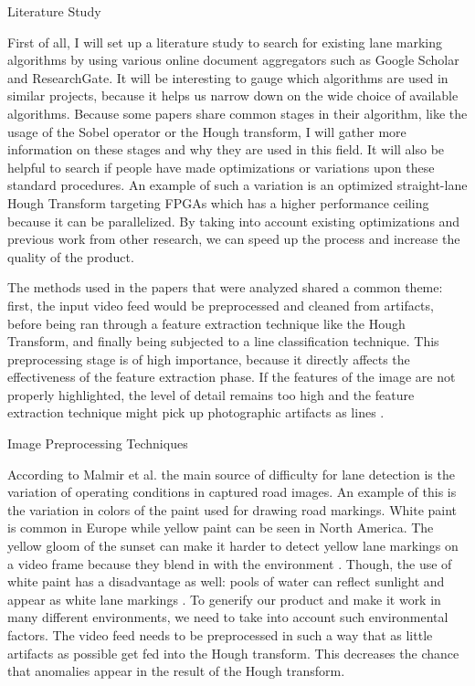\documentclass{matthijs}
\begin{document}
	\begin{hoofdstuk}{Literature Study}

		First of all, I will set up a literature study to search for existing lane marking algorithms by using various online document aggregators such as Google Scholar and ResearchGate.
		It will be interesting to gauge which algorithms are used in similar projects, because it helps us narrow down on the wide choice of available algorithms.
		Because some papers share common stages in their algorithm, like the usage of the Sobel operator or the Hough transform, I will gather more information on these stages and why they are used in this field.
		It will also be helpful to search if people have made optimizations or variations upon these standard procedures.
		An example of such a variation is an optimized straight-lane Hough Transform targeting FPGAs \cite{el2020novel} which has a higher performance ceiling because it can be parallelized.
		By taking into account existing optimizations and previous work from other research, we can speed up the process and increase the quality of the product.
	
		The methods used in the papers that were analyzed shared a common theme: first, the input video feed would be preprocessed and cleaned from artifacts, before being ran through a feature extraction technique like the Hough Transform, and finally being subjected to a line classification technique.
		This preprocessing stage is of high importance, because it directly affects the effectiveness of the feature extraction phase.
		If the features of the image are not properly highlighted, the level of detail remains too high and the feature extraction technique might pick up photographic artifacts as lines \cite{felix2003low}.

		\begin{paragraaf}{Image Preprocessing Techniques}

			According to Malmir et al. \cite{malmir2019design} the main source of difficulty for lane detection is the variation of operating conditions in captured road images.
			An example of this is the variation in colors of the paint used for drawing road markings.
			White paint is common in Europe while yellow paint can be seen in North America.
			The yellow gloom of the sunset can make it harder to detect yellow lane markings on a video frame because they blend in with the environment \cite{tumasov2021research}.
			Though, the use of white paint has a disadvantage as well: pools of water can reflect sunlight and appear as white lane markings \cite{krine2021road}.
			To generify our product and make it work in many different environments, we need to take into account such environmental factors.
			The video feed needs to be preprocessed in such a way that as little artifacts as possible get fed into the Hough transform.
			This decreases the chance that anomalies appear in the result of the Hough transform.
			

\end{paragraaf}
\end{hoofdstuk}
\end{document}
